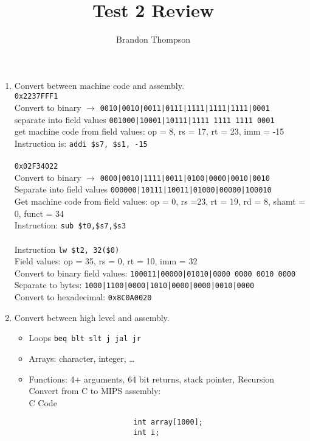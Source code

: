 \documentclass[a4paper]{article}
\begin{document}
	\title{Test 2 Review}
	\author{Brandon Thompson}
	\maketitle

	\begin{enumerate}
		\item Convert between machine code and assembly.\\
			\verb|0x2237FFF1|\\
			Convert to binary $\to$ \verb+0010|0010|0011|0111|1111|1111|1111|0001+\\
			separate into field values \verb+001000|10001|10111|1111 1111 1111 0001+\\
			get machine code from field values: op = 8, rs = 17, rt = 23, imm = -15\\
			Instruction is: \verb|addi $s7, $s1, -15|\\
			\\\verb|0x02F34022|\\
			Convert to binary $\to$ \verb+0000|0010|1111|0011|0100|0000|0010|0010+\\
			Separate into field values \verb+000000|10111|10011|01000|00000|100010+\\
			Get machine code from field values: op = 0, rs =23, rt = 19, rd = 8, shamt = 0, funct = 34\\
			Instruction: \verb|sub $t0,$s7,$s3|\\
			\\Instruction \verb|lw $t2, 32($0)|\\
			Field values: op = 35, rs = 0, rt = 10, imm = 32\\
			Convert to binary field values: \verb+100011|00000|01010|0000 0000 0010 0000+\\
			Separate to bytes: \verb+1000|1100|0000|1010|0000|0000|0010|0000+\\
			Convert to hexadecimal: \verb|0x8C0A0020|\\

		\item Convert between high level and assembly.
			\begin{itemize}
				\item Loops \verb+beq blt slt j jal jr+
				\item Arrays: character, integer, \ldots
				\item Functions: 4+ arguments, 64 bit returns, stack pointer, Recursion\\
					Convert from C to MIPS assembly:\\
					C Code
					\begin{verbatim}
						int array[1000];
						int i;


\end{verbatim}
\end{itemize}
\end{enumerate}
\end{document}

